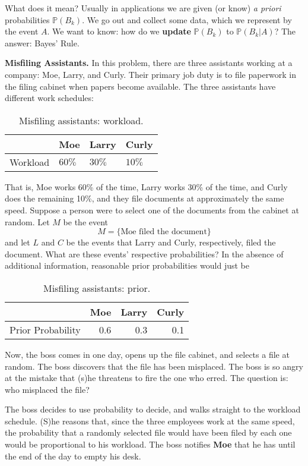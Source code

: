 What does it mean? Usually in applications we are given (or know) \emph{a
priori} probabilities \(\mathbb{P}(B_{k})\). We go out and collect
some data, which we represent by the event \(A\). We want to know: how
do we \textbf{update} \(\mathbb{P}(B_{k})\) to \(\mathbb{P}(B_{k}|A)\)? The
answer: Bayes' Rule.

\label{exa-misfiling-assistants} \textbf{Misfiling Assistants.} In this problem,
there are three assistants working at a company: Moe, Larry, and
Curly. Their primary job duty is to file paperwork in the filing
cabinet when papers become available. The three assistants have
different work schedules:

\begin{table}[htb]
\caption[Misfiling assistants: workload]{Misfiling assistants: workload.}
\centering
\begin{tabular}{llll}
 & Moe & Larry & Curly\\
\hline
Workload & \(60\%\) & \(30\%\) & \(10\%\)\\
\end{tabular}
\end{table}

That is, Moe works 60\% of the time, Larry works 30\% of the time, and
Curly does the remaining 10\%, and they file documents at approximately
the same speed. Suppose a person were to select one of the documents
from the cabinet at random. Let \(M\) be the event \[ M= \{ \mbox{Moe
filed the document} \} \] and let \(L\) and \(C\) be the events that
Larry and Curly, respectively, filed the document. What are these
events' respective probabilities? In the absence of additional
information, reasonable prior probabilities would just be

\begin{table}[htb]
\caption[Misfiling assistants: prior]{Misfiling assistants: prior.}
\centering
\begin{tabular}{lrrr}
 & Moe & Larry & Curly\\
\hline
Prior Probability & 0.6 & 0.3 & 0.1\\
\end{tabular}
\end{table}

Now, the boss comes in one day, opens up the file cabinet, and selects
a file at random. The boss discovers that the file has been
misplaced. The boss is so angry at the mistake that (s)he threatens to
fire the one who erred. The question is: who misplaced the file?

The boss decides to use probability to decide, and walks straight to
the workload schedule. (S)he reasons that, since the three employees
work at the same speed, the probability that a randomly selected file
would have been filed by each one would be proportional to his
workload. The boss notifies \textbf{Moe} that he has until the end of the day
to empty his desk.

